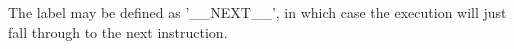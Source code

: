 The label may be defined as '\_\_NEXT\_\_',
in which case the execution will just fall through to the next instruction.
